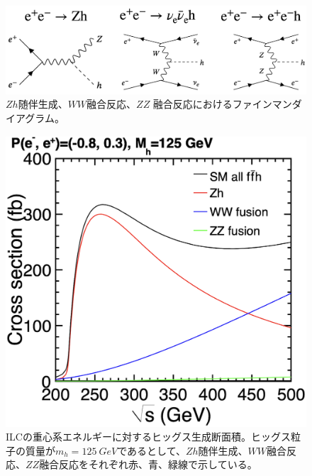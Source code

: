 \begin{figure}[h]
\begin{center}
 \includegraphics[keepaspectratio, scale=0.25]
 	{Figure/Introduction/higgs_cs_feynman.png}
	\caption{$Zh$随伴生成、$WW$融合反応、$ZZ$ 融合反応におけるファインマンダイアグラム\cite{tdr2}。}
	\label{product}
\end{center}
\end{figure}

\begin{figure}[H]
	\begin{center}
 \includegraphics[keepaspectratio, scale=0.3]
 	{Figure/Introduction/hcs.png}
	 	\caption{ILCの重心系エネルギーに対するヒッグス生成断面積。ヒッグス粒子の質量が$m_h=\SI{125}{GeV}$であるとして、$Zh$随伴生成、$WW$融合反応、$ZZ$融合反応をそれぞれ赤、青、緑線で示している\cite{tdr2}。}
 	\label{hcs}
	\end{center}
 \end{figure}
 
